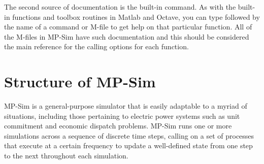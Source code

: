 \documentclass[12pt]{article}
\newcommand{\matlab}[0]{{\sc Matlab}}
\newcommand{\mpsim}[0]{{MP-Sim}}
\newcommand{\code}[1]{{\relsize{-0.5}{\tt{{#1}}}}}  %
\numberwithin{equation}{section}
\numberwithin{table}{section}
\numberwithin{figure}{section}
\begin{document}
The second source of documentation is the built-in \code{help} command. As with the built-in functions and toolbox routines in \matlab{} and Octave, you can type \code{help} followed by the name of a command or M-file to get help on that particular function. All of the M-files in \mpsim{} have such documentation and this should be considered the main reference for the calling options for each function.%

\clearpage
\section{Structure of \mpsim{}}
\mpsim{} is a general-purpose simulator that is easily adaptable to a myriad of situations, including those pertaining to electric power systems such as unit commitment and economic dispatch problems. \mpsim{} runs one or more simulations across a sequence of discrete time steps, calling on a set of processes that execute at a certain frequency to update a well-defined state from one step to the next throughout each simulation.

\end{document}
